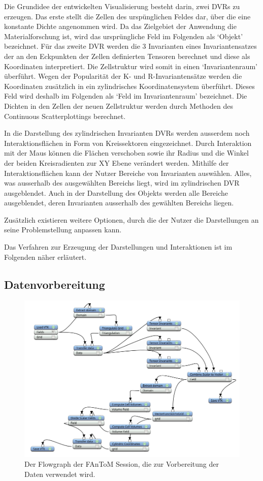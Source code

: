 \documentclass[a4paper,fontsize=12pt,toc=bib,halfparskip]{scrartcl}
\begin{document}
Die Grundidee der entwickelten Visualisierung besteht darin, zwei DVRs zu erzeugen. Das erste stellt die Zellen des ursp\"unglichen Feldes dar, \"uber die eine konstante Dichte angenommen wird. Da das Zielgebiet der Anwendung die Materialforschung ist, wird das urspr\"ungliche Feld im Folgenden als `Objekt' bezeichnet. F\"ur das zweite DVR werden die 3 Invarianten eines Invariantensatzes der an den Eckpunkten der Zellen definierten Tensoren berechnet und diese als Koordinaten interpretiert. Die Zellstruktur wird somit in einen `Invariantenraum' \"uberf\"uhrt. Wegen der Popularit\"at der K- und R-Invariantens\"atze werden die Koordinaten zus\"atzlich in ein zylindrisches Koordinatensystem \"uberf\"uhrt. Dieses Feld wird deshalb im Folgenden als `Feld im Invariantenraum' bezeichnet. Die Dichten in den Zellen der neuen Zellstruktur werden durch Methoden des Continuous Scatterplottings berechnet.

In die Darstellung des zylindrischen Invarianten DVRs werden ausserdem noch Interaktionsfl\"achen in Form von Kreissektoren eingezeichnet. Durch Interaktion mit der Maus k\"onnen die Fl\"achen verschoben sowie ihr Radius und die Winkel der beiden Kreisradienten zur XY Ebene ver\"andert werden.
Mithilfe der Interaktionsfl\"achen kann der Nutzer Bereiche von Invarianten ausw\"ahlen. Alles, was ausserhalb des ausgew\"ahlten Bereichs liegt, wird im zylindrischen DVR ausgeblendet. Auch in der Darstellung des Objekts werden alle Bereiche ausgeblendet, deren Invarianten ausserhalb des gew\"ahlten Bereichs liegen. 

Zus\"atzlich existieren weitere Optionen, durch die der Nutzer die Darstellungen an seine Problemstellung anpassen kann.

Das Verfahren zur Erzeugung der Darstellungen und Interaktionen ist im Folgenden n\"aher erl\"autert.

\subsection{Datenvorbereitung}
\begin{figure}
	\centering
	\includegraphics[width=\textwidth]{pictures/BigSession.png}
	\caption{Der Flowgraph der FAnToM Session, die zur Vorbereitung der Daten verwendet wird.}
	\label{BigSession}
\end{figure}
\end{document}
